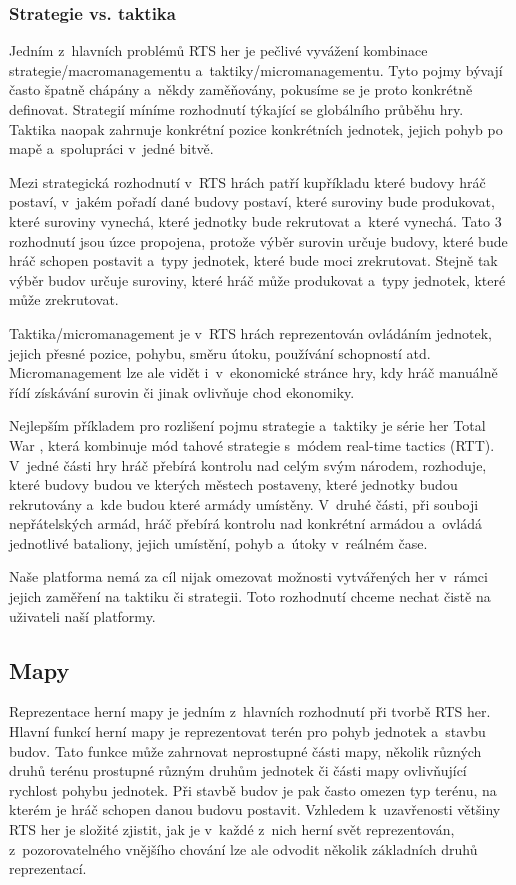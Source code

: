 \subsubsection*{Strategie vs. taktika}
Jedním z~hlavních problémů RTS her je pečlivé vyvážení kombinace strategie/macromanagementu a~taktiky/micromanagementu. Tyto pojmy bývají často špatně chápány a~někdy zaměňovány, pokusíme se je proto konkrétně definovat. Strategií míníme rozhodnutí týkající se globálního průběhu hry. Taktika naopak zahrnuje konkrétní pozice konkrétních jednotek, jejich pohyb po mapě a~spolupráci v~jedné bitvě. 

Mezi strategická rozhodnutí v~RTS hrách patří kupříkladu které budovy hráč postaví, v~jakém pořadí dané budovy postaví, které suroviny bude produkovat, které suroviny vynechá, které jednotky bude rekrutovat a~které vynechá. Tato 3 rozhodnutí jsou úzce propojena, protože výběr surovin určuje budovy, které bude hráč schopen postavit a~typy jednotek, které bude moci zrekrutovat. Stejně tak výběr budov určuje suroviny, které hráč může produkovat a~typy jednotek, které může zrekrutovat. 

Taktika/micromanagement je v~RTS hrách reprezentován ovládáním jednotek, jejich přesné pozice, pohybu, směru útoku, používání schopností atd. Micromanagement lze ale vidět i~v~ekonomické stránce hry, kdy hráč manuálně řídí získávání surovin či jinak ovlivňuje chod ekonomiky.

Nejlepším příkladem pro rozlišení pojmu strategie a~taktiky je série her Total War \citep{site:totalwar}, která kombinuje mód tahové strategie s~módem real-time tactics (RTT). V~jedné části hry hráč přebírá kontrolu nad celým svým národem, rozhoduje, které budovy budou ve kterých městech postaveny, které jednotky budou rekrutovány a~kde budou které armády umístěny. V~druhé části, při souboji nepřátelských armád, hráč přebírá kontrolu nad konkrétní armádou a~ovládá jednotlivé bataliony, jejich umístění, pohyb a~útoky v~reálném čase.

Naše platforma nemá za cíl nijak omezovat možnosti vytvářených her v~rámci jejich zaměření na taktiku či strategii. Toto rozhodnutí chceme nechat čistě na uživateli naší platformy.

\subsection{Mapy}
\label{sec:mapy}
Reprezentace herní mapy je jedním z~hlavních rozhodnutí při tvorbě RTS her. Hlavní funkcí herní mapy je reprezentovat terén pro pohyb jednotek a~stavbu budov. 
Tato funkce může zahrnovat neprostupné části mapy, několik různých druhů terénu prostupné různým druhům jednotek či části mapy ovlivňující rychlost pohybu jednotek.
Při stavbě budov je pak často omezen typ terénu, na kterém je hráč schopen danou budovu postavit. 
Vzhledem k~uzavřenosti většiny RTS her je složité zjistit, jak je v~každé z~nich herní svět reprezentován, z~pozorovatelného vnějšího chování lze ale odvodit několik základních druhů reprezentací. 

